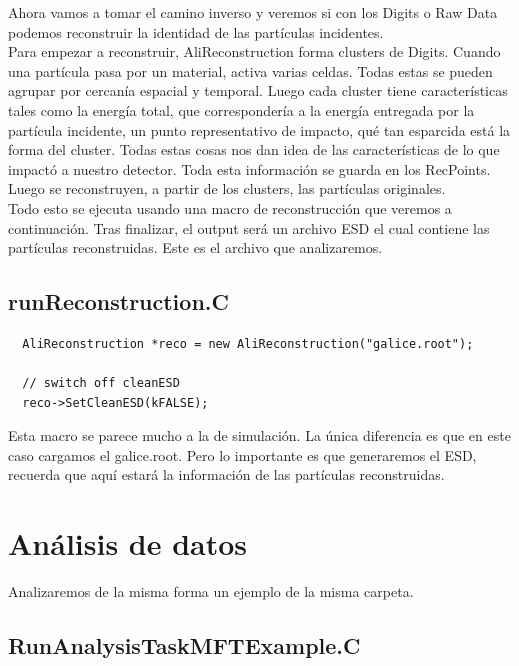 \documentclass{article}
\begin{document}
Ahora vamos a tomar el camino inverso y veremos si con los Digits o Raw Data podemos reconstruir la identidad de las part\'iculas incidentes.\\
Para empezar a reconstruir, AliReconstruction forma clusters de Digits. Cuando una part\'icula pasa por un material, activa varias celdas. Todas estas se pueden agrupar por cercan\'ia espacial y temporal. Luego cada cluster tiene caracter\'isticas tales como la energ\'ia total, que corresponder\'ia a la energ\'ia entregada por la part\'icula incidente, un punto representativo de impacto, qu\'e tan esparcida est\'a la forma del cluster. Todas estas cosas nos dan idea de las caracter\'isticas de lo que impact\'o a nuestro detector.
Toda esta informaci\'on se guarda en los RecPoints.\\
Luego se reconstruyen, a partir de los clusters, las part\'iculas originales. \\
Todo esto se ejecuta usando una macro de reconstrucci\'on que veremos a continuaci\'on. Tras finalizar, el output ser\'a un archivo ESD el cual contiene las part\'iculas reconstruidas. Este es el archivo que analizaremos.

\subsection{runReconstruction.C}

\begin{tcolorbox}[breakable]
\begin{verbatim}
  AliReconstruction *reco = new AliReconstruction("galice.root");

  // switch off cleanESD
  reco->SetCleanESD(kFALSE);
\end{verbatim}
\end{tcolorbox}

Esta macro se parece mucho a la de simulaci\'on. La \'unica diferencia es que en este caso cargamos el galice.root. Pero lo importante es que generaremos el ESD, recuerda que aqu\'i estar\'a la informaci\'on de las part\'iculas reconstruidas.


\newpage
\section{Análisis de datos}

Analizaremos de la misma forma un ejemplo de la misma carpeta.

\subsection{RunAnalysisTaskMFTExample.C}
\end{document}
